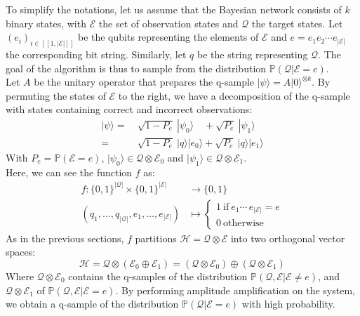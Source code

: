 To simplify the notations, let us assume that the Bayesian network consists of $k$ binary states, with $\mathcal{E}$ the set of observation states and $\mathcal{Q}$ the target states.
Let $(e_i)_{i \in [\![1,|\mathcal{E}|]\!]}$ be the qubits representing the elements of $\mathcal{E}$ and $e = e_1e_2\cdots e_{|\mathcal{E}|}$ the corresponding bit string. Similarly, let $q$ be the string representing $\mathcal{Q}$.
The goal of the algorithm is thus to sample from the distribution $\mathbb{P}(\mathcal{Q}|\mathcal{E}=e)$.
\\
Let $A$ be the unitary operator that prepares the q-sample $| \psi \rangle = A |0\rangle ^{\otimes k}$. By permuting the states of $\mathcal{E}$ to the right, we have a decomposition of the q-sample with states containing correct and incorrect observations:
\begin{align*}
	|\psi \rangle =&\ \sqrt{1-P_e}\ |\psi_0\rangle \quad + \sqrt{P_e}\ |\psi_1\rangle \\
	=&\ \sqrt{1-P_e}\ |q\rangle |e_0\rangle + \sqrt{P_e}\ |q\rangle |e_1\rangle
\end{align*}
With $P_e = \mathbb{P}(\mathcal{E}=e)$, $|\psi_0 \rangle \in \mathcal{Q} \otimes \mathcal{E}_0$ and $|\psi_1 \rangle \in \mathcal{Q} \otimes \mathcal{E}_1$.
\\
Here, we can see the function $f$ as:
\begin{align*}
    f : \{0,1\}^{|\mathcal{Q}|}\times\{0,1\}^{|\mathcal{E}|} &\longrightarrow \{0,1\} \\
    (q_1,\hdots,q_{|\mathcal{Q}|}, e_1,\hdots,e_{|\mathcal{E}|}) &\longmapsto
 \begin{cases}
 1 \ \mathrm{if} \ e_1 \cdots \, e_{|\mathcal{E}|} = e \\
 0 \ \mathrm{otherwise}
 \end{cases}
\end{align*}
As in the previous sections, $f$ partitions $\mathcal{H} = \mathcal{Q} \otimes \mathcal{E}$ into two orthogonal vector spaces:
\[\mathcal{H} = \mathcal{Q} \otimes (\mathcal{E}_0 \oplus \mathcal{E}_1) = (\mathcal{Q} \otimes \mathcal{E}_0) \oplus (\mathcal{Q} \otimes \mathcal{E}_1)\]
Where $\mathcal{Q} \otimes \mathcal{E}_0$ contains the q-samples of the distribution $\mathbb{P}(\mathcal{Q,E}|\mathcal{E}\neq e)$, and $\mathcal{Q} \otimes \mathcal{E}_1$ of $\mathbb{P}(\mathcal{Q,E}|\mathcal{E} = e)$.
By performing amplitude amplification on the system, we obtain a q-sample of the distribution $\mathbb{P}(\mathcal{Q}|\mathcal{E} = e)$ with high probability.

